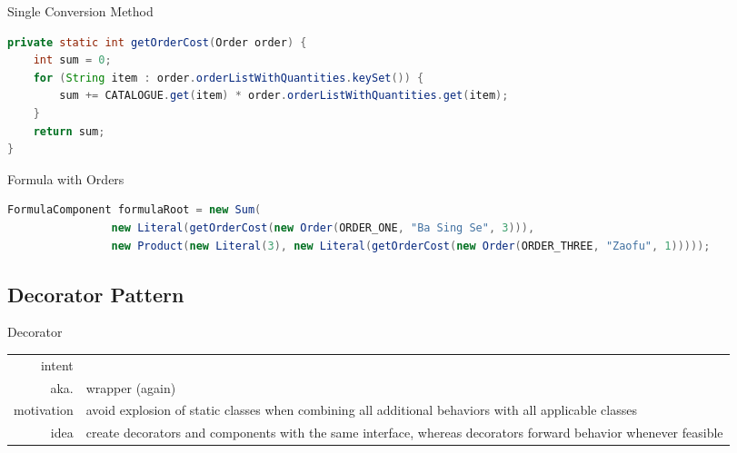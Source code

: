 \begin{frame}[fragile]
\begin{fancycolumns}[widths={50,50}, t]
\begin{example}{Single Conversion Method}
\begin{lstlisting}[language=Java, basicstyle=\footnotesize]
private static int getOrderCost(Order order) {
	int sum = 0;
	for (String item : order.orderListWithQuantities.keySet()) {
		sum += CATALOGUE.get(item) * order.orderListWithQuantities.get(item);
	}
	return sum;
}
			\end{lstlisting}
			\vspace{-3mm}
		\end{example}
		\begin{example}{Formula with Orders}
			\vspace{-3mm}
			\begin{lstlisting}[language=Java, basicstyle=\footnotesize]
        FormulaComponent formulaRoot = new Sum(
                new Literal(getOrderCost(new Order(ORDER_ONE, "Ba Sing Se", 3))),
                new Product(new Literal(3), new Literal(getOrderCost(new Order(ORDER_THREE, "Zaofu", 1)))));
		\end{lstlisting}
			\vspace{-3mm}
		\end{example}
	\end{fancycolumns}


\end{frame}



\subsection{Decorator Pattern}
\begin{frame}{\insertsubsection}
	\begin{fancycolumns}
		\begin{definition}{Decorator \mysource{\gof}}
			\setlength\tabcolsep{1mm}
			\begin{tabularx}{\textwidth}{rX}
				intent     & \mycite{Attach additional responsibilities to an object dynamically. Decorators provide a flexible alternative to subclassing for extending functionality.} \\
				aka.       & wrapper (again)                                                                                                                                             \\
				motivation & avoid explosion of static classes when combining all additional behaviors with all applicable classes                                                       \\
				idea       & create decorators and components with the same interface, whereas decorators forward behavior whenever feasible
			\end{tabularx}
		\end{definition}
		\nextcolumn
	\end{fancycolumns}
\end{frame}

